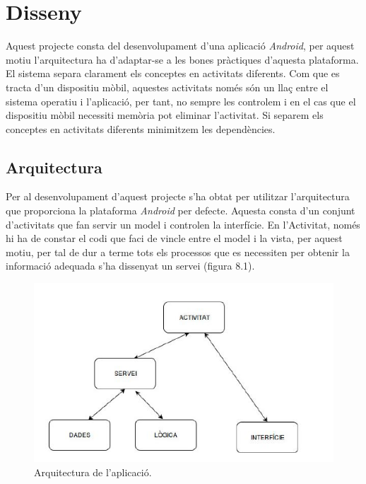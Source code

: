 
\chapter{Disseny} %

\label{Disseny} %

Aquest projecte consta del desenvolupament d'una aplicació \textit{Android}, per aquest motiu l'arquitectura ha d'adaptar-se a les bones pràctiques d'aquesta plataforma.\\

El sistema separa clarament els conceptes en activitats diferents. Com que es tracta d'un dispositiu mòbil, aquestes activitats només són un llaç entre el sistema operatiu i l'aplicació, per tant, no sempre les controlem i en el cas que el dispositiu mòbil necessiti memòria pot eliminar l'activitat. Si separem els conceptes en activitats diferents minimitzem les dependències.

\section{Arquitectura}

Per al desenvolupament d'aquest projecte s'ha obtat per utilitzar l'arquitectura que proporciona la plataforma \textit{Android} per defecte. Aquesta consta d'un conjunt d'activitats que fan servir un model i controlen la interfície. En l'Activitat, només hi ha de constar el codi que faci de vincle entre el model i la vista, per aquest motiu, per tal de dur a terme tots els processos que es necessiten per obtenir la informació adequada s'ha dissenyat un servei (figura 8.1).

\begin{figure}[!h]
\centering
\includegraphics[scale=0.65]{Figures/ArquitecturaSistema.jpg}
\caption{Arquitectura de l'aplicació.}
\end{figure}

